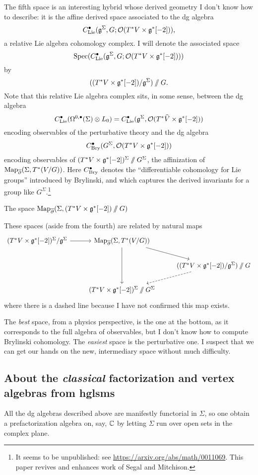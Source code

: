 \documentclass[11pt]{amsart}
\begin{document}
The fifth space is an interesting hybrid whose derived geometry I don't know how to describe:
it is the affine derived space associated to the dg algebra
\[
C^\bullet_{\rm Lie}(\mathfrak g^\Sigma, G; \mathcal O(T^* V \times \mathfrak g^*[-2])),
\]
a relative Lie algebra cohomology complex. 
I will denote the associated space
\[
\operatorname{Spec}(C^\bullet_{\rm Lie}(\mathfrak g^\Sigma, G; \mathcal O(T^* V \times \mathfrak g^*[-2])))
\]
by
\[
((T^* V \times \mathfrak g^*[-2])/\mathfrak g^\Sigma)\mathbin{/\mkern-6mu/} G.
\]
Note that this relative Lie algebra complex sits, in some sense, between the dg algebra
\[
C^\bullet_{\rm Lie}(\Omega^{0,\bullet}(\Sigma) \otimes L_0) = C^\bullet_{\rm Lie}(\mathfrak g^\Sigma, \mathcal O(T^*\widehat{V} \times \mathfrak g^*[-2]))
\]
encoding observables of the perturbative theory
and the dg algebra
\[
C^\bullet_{\rm Bry}(G^\Sigma, \mathcal O(T^* V \times \mathfrak g^*[-2]))
\]
encoding observables of $(T^*V \times \mathfrak g^*[-2])^\Sigma \mathbin{/\mkern-6mu/} G^\Sigma$,
the affinization of~${\rm Map}_{\overline{\partial}}(\Sigma, T^*(V/G))$.
Here $C^\bullet_{\rm Bry}$ denotes the ``differentiable cohomology for Lie groups'' introduced by Brylinski, 
and which captures the derived invariants for a group like $G^\Sigma$.\footnote{It seems to be unpublished: see \url{https://arxiv.org/abs/math/0011069}. This paper revives and enhances work of Segal and Mitchison.}

The space ${\rm Map}_{\overline{\partial}}(\Sigma,(T^*V \times \mathfrak g^*[-2])\mathbin{/\mkern-6mu/} G)$ 

These spaces (aside from the fourth) are related by natural maps
\[
\begin{tikzcd}
(T^* V \times \fg^*[-2])^\Sigma/\fg^\Sigma \arrow[r] & \Map_{\dbar}(\Sigma, T^*(V/G)) \arrow[dd] \arrow[dr]& \\
&&  ((T^* V \times \fg^*[-2])/\fg^\Sigma)\sslash G \arrow[dl, dashed] \\
&(T^*V \times \fg^*[-2])^\Sigma \sslash G^\Sigma&
\end{tikzcd}
\]
where there is a dashed line because I have not confirmed this map exists.

The {\em best} space, from a physics perspective, is the one at the bottom,
as it corresponds to the full algebra of observables,
but I don't know how to compute Brylinski cohomology.
The {\em easiest} space is the perturbative one.
I suspect that we can get our hands on the new, intermediary space without much difficulty.

\subsection{About the {\it classical} factorization and vertex algebras from hglsms}

All the dg algebras described above are manifestly functorial in $\Sigma$, 
so one obtain a prefactorization algebra on, say, $\mathbb C$ by letting $\Sigma$ run over open sets in the complex plane.
\end{document}
